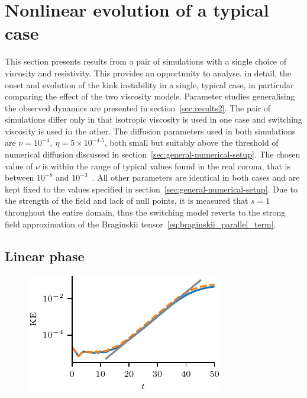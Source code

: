 \section{Nonlinear evolution of a typical case}
\label{sec:results}

This section presents results from a pair of simulations with a single choice of viscosity and resistivity. This provides an opportunity to analyse, in detail, the onset and evolution of the kink instability in a single, typical case, in particular comparing the effect of the two viscosity models. Parameter studies generalising the observed dynamics are presented in section~\ref{sec:results2}. The pair of simulations differ only in that isotropic viscosity is used in one case and switching viscosity is used in the other. The diffusion parameters used in both simulations are $\nu = 10^{-4},\ \eta = 5\times 10^{-4.5}$, both small but suitably above the threshold of numerical diffusion discussed in section~\ref{sec:general-numerical-setup}. The chosen value of $\nu$ is within the range of typical values found in the real corona, that is between $10^{-8}$ and $10^{-3}$~\cite{rudermanSlowSurfaceWave2000a}. All other parameters are identical in both cases and are kept fixed to the values specified in section~\ref{sec:general-numerical-setup}. Due to the strength of the field and lack of null points, it is measured that $s=1$ throughout the entire domain, thus the switching model reverts to the strong field approximation of the Braginskii tensor~\eqref{eq:braginskii_parallel_term}.

\subsection{Linear phase}

\begin{figure}[t]
  \centering
  \includegraphics[width=0.5\linewidth]{log_kinetic_energy_over_time.pdf}
  \label{fig:log_kinetic_energy_over_time}
\end{figure}

